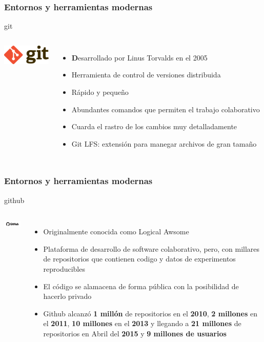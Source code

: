 \documentclass[sans serif,9pt,xcolor=dvipsnames]{beamer}%
\begin{document}
\begin{frame}
\frametitle {Entornos y herramientas modernas}
\justifying
\begin{block}{git}
\begin{columns}
 \hspace{0.7cm}
\includegraphics[width=2.3cm]{imagenes/git.png} 
\begin{itemize}
\justifying
\item \textbf Desarrollado por Linus Torvalds en el 2005 
\item Herramienta de control de versiones distribuida
\item Rápido y pequeño
\item Abundantes comandos que permiten el trabajo colaborativo 
\item Cuarda el rastro de los cambios muy detalladamente
\item Git LFS: extensión para manegar archivos de gran tamaño 
\end{itemize}
\end{columns}
\end{block}
\end{frame}

\begin{frame}
\frametitle {Entornos y herramientas modernas}
\justifying
\begin{block}{github}
\begin{columns}
 \hspace{0.7cm}
\includegraphics[width=2.3cm]{imagenes/github.png} 
\begin{itemize}
\justifying
\item Originalmente conocida como Logical Awsome
\item Plataforma de desarrollo de software colaborativo, pero, con millares de repositorios que contienen codigo y datos de experimentos reproducibles
\item El código se alamacena de forma pública con la posibilidad de hacerlo privado
\item Github alcanzó \textbf{1 millón} de repositorios en el \textbf{2010}, \textbf{2 millones} en el \textbf{2011}, \textbf{10 millones} en el \textbf{2013} y llegando a \textbf{21 millones} de repositorios en Abril del \textbf{2015} y \textbf{9 millones de usuarios}
\end{itemize}
\end{columns}
\end{block}
\end{frame}
\end{document}
